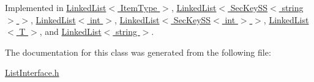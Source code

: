 Implemented in \hyperlink{classLinkedList_a3035f880c50e7d8f68e67c093d4607ca}{Linked\+List$<$ Item\+Type $>$}, \hyperlink{classLinkedList_a3035f880c50e7d8f68e67c093d4607ca}{Linked\+List$<$ Sec\+Key\+S\+S$<$ string $>$ $>$}, \hyperlink{classLinkedList_a3035f880c50e7d8f68e67c093d4607ca}{Linked\+List$<$ int $>$}, \hyperlink{classLinkedList_a3035f880c50e7d8f68e67c093d4607ca}{Linked\+List$<$ Sec\+Key\+S\+S$<$ int $>$ $>$}, \hyperlink{classLinkedList_a3035f880c50e7d8f68e67c093d4607ca}{Linked\+List$<$ T $>$}, and \hyperlink{classLinkedList_a3035f880c50e7d8f68e67c093d4607ca}{Linked\+List$<$ string $>$}.



The documentation for this class was generated from the following file\+:\begin{DoxyCompactItemize}
\item 
\hyperlink{ListInterface_8h}{List\+Interface.\+h}\end{DoxyCompactItemize}
